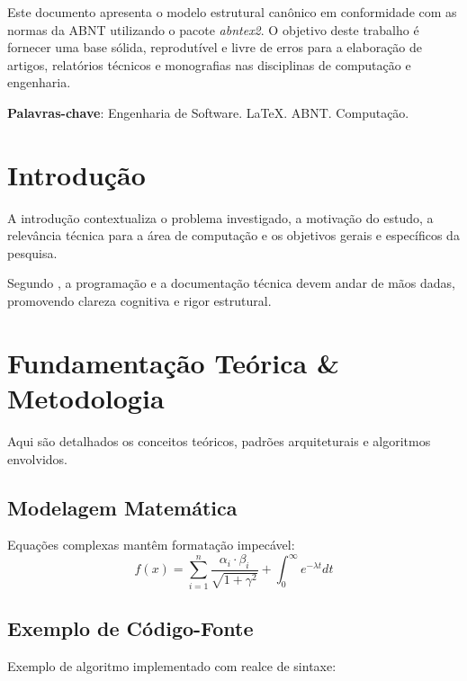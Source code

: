 \documentclass[
    12pt,               %
    openright,          %
    oneside,            %
    a4paper,            %
    english,            %
    brazil              %
]{abntex2}
\begin{document}
\frenchspacing 

\imprimircapa
\imprimirfolhaderosto

\setlength{\absparsep}{18pt}
\begin{resumo}
 Este documento apresenta o modelo estrutural canônico em conformidade com as normas da ABNT utilizando o pacote \textit{abntex2}. O objetivo deste trabalho é fornecer uma base sólida, reprodutível e livre de erros para a elaboração de artigos, relatórios técnicos e monografias nas disciplinas de computação e engenharia.
 
 \textbf{Palavras-chave}: Engenharia de Software. LaTeX. ABNT. Computação.
\end{resumo}

\tableofcontents*
\cleardoublepage

\textual

\chapter{Introdução}
A introdução contextualiza o problema investigado, a motivação do estudo, a relevância técnica para a área de computação e os objetivos gerais e específicos da pesquisa.

Segundo , a programação e a documentação técnica devem andar de mãos dadas, promovendo clareza cognitiva e rigor estrutural.

\chapter{Fundamentação Teórica \& Metodologia}
Aqui são detalhados os conceitos teóricos, padrões arquiteturais e algoritmos envolvidos.

\section{Modelagem Matemática}
Equações complexas mantêm formatação impecável:
\begin{equation}
    f(x) = \sum_{i=1}^{n} \frac{\alpha_i \cdot \beta_i}{\sqrt{1 + \gamma^2}} + \int_{0}^{\infty} e^{-\lambda t} dt
\end{equation}

\section{Exemplo de Código-Fonte}
Exemplo de algoritmo implementado com realce de sintaxe:
\end{document}
